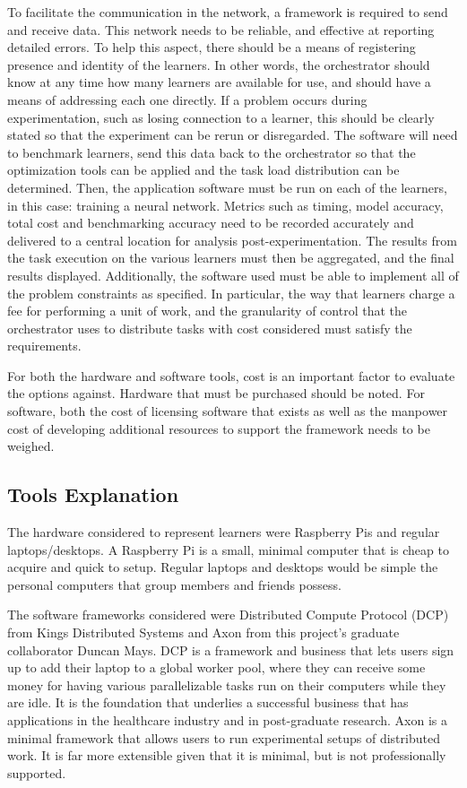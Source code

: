 \documentclass[../mthe-493-final-project.tex]{subfiles}
\begin{document}
    To facilitate the communication in the network, a framework is required to send and receive data. This network needs to be reliable, and effective at reporting detailed errors. To help this aspect, there should be a means of registering presence and identity of the learners. In other words, the orchestrator should know at any time how many learners are available for use, and should have a means of addressing each one directly. If a problem occurs during experimentation, such as losing connection to a learner, this should be clearly stated so that the experiment can be rerun or disregarded. The software will need to benchmark learners, send this data back to the orchestrator so that the optimization tools can be applied and the task load distribution can be determined. Then, the application software must be run on each of the learners, in this case: training a neural network. Metrics such as timing, model accuracy, total cost and benchmarking accuracy need to be recorded accurately and delivered to a central location for analysis post-experimentation. The results from the task execution on the various learners must then be aggregated, and the final results displayed. Additionally, the software used must be able to implement all of the problem constraints as specified. In particular, the way that learners charge a fee for performing a unit of work, and the granularity of control that the orchestrator uses to distribute tasks with cost considered must satisfy the requirements.
    
    For both the hardware and software tools, cost is an important factor to evaluate the options against. Hardware that must be purchased should be noted. For software, both the cost of licensing software that exists as well as the manpower cost of developing additional resources to support the framework needs to be weighed. 
    
    \subsection{Tools Explanation}
    The hardware considered to represent learners were Raspberry Pis and regular laptops/desktops. A Raspberry Pi is a small, minimal computer that is cheap to acquire and quick to setup. Regular laptops and desktops would be simple the personal computers that group members and  friends possess. 
    
    The software frameworks considered were Distributed Compute Protocol (DCP) from Kings Distributed Systems and Axon from this project's graduate collaborator Duncan Mays. DCP is a framework and business that lets users sign up to add their laptop to a global worker pool, where they can receive some money for having various parallelizable tasks run on their computers while they are idle. It is the foundation that underlies a successful business that has applications in the healthcare industry and in post-graduate research. Axon is a minimal framework that allows users to run experimental setups of distributed work. It is far more extensible given that it is minimal, but is not professionally supported.
\end{document}
